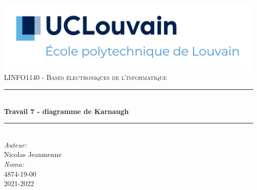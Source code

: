 \begin{titlepage}

    \newcommand{\HRule}{\rule{\linewidth}{0.5mm}} 							%
    \center 
     
    \includegraphics[width=\textwidth]{../pictures/UCLouvain-EPL.png}\\[1cm]
    
    \textsc{\large 
    LINFO1140 - Bases électroniques de l'informatique}\\[1cm] 										%
    \HRule \\[0.8cm]
    {\huge \bfseries Travail 7 - diagramme de Karnaugh}\\[0.7cm]								%
    \HRule \\[2cm]
    \large
    \emph{Auteur:}\\
    Nicolas Jeanmenne\\[1.5cm]
    \emph{Noma:}\\
    4874-19-00\\[1.5cm]
    \vfill													%
    {\large 2021-2022}\\[5cm] 	%
    
    \vfill
\end{titlepage}